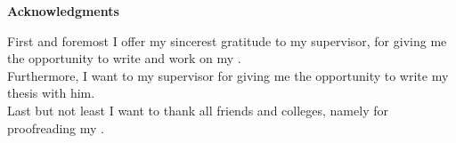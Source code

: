 \cleardoublepage{}
\thispagestyle{plain}
\vspace*{\fill}
{\begin{center}
    \huge\textbf{Acknowledgments}
\end{center}}
\vspace*{0.05\textheight}

\noindent First and foremost I offer my sincerest gratitude to my supervisor, \getSupervisor{} for giving me the opportunity
to write and work on my \getDoctypeShort{}. \\

\noindent Furthermore, I want to my supervisor \getAdvisor{} for giving me the opportunity to write my thesis with him. \\

\noindent Last but not least I want to thank all friends and colleges, namely \getProofReaders{} for
proofreading my \getDoctypeShort{}.

\vfill
